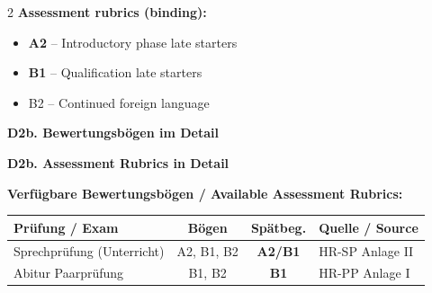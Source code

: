 \documentclass[10pt,a4paper]{article}
\newcommand{\secbil}[2]{%
\vspace{6pt}
\noindent\colorbox{spaet}{\parbox{0.48\textwidth}{\color{white}\bfseries\small #1}}%
\hfill%
\colorbox{english}{\parbox{0.48\textwidth}{\color{white}\bfseries\small #2}}
\vspace{3pt}
}
\begin{document}
\begin{paracol}{2}
\textbf{Assessment rubrics (binding):}\footnotemark[12]
\begin{itemize}[noitemsep,topsep=2pt]
\item \textcolor{spaet}{\textbf{A2}} -- Introductory phase late starters
\item \textcolor{spaet}{\textbf{B1}} -- Qualification late starters
\item B2 -- Continued foreign language
\end{itemize}

\end{paracol}


\vspace{3mm}

\secbil{D2b. Bewertungsbögen im Detail}{D2b. Assessment Rubrics in Detail}

\vspace{2mm}

\begin{center}
\small
\textbf{Verfügbare Bewertungsbögen / Available Assessment Rubrics:}
\vspace{1mm}

\begin{tabular}{|l|c|c|l|}
\hline
\rowcolor{lightgray}
\textbf{Prüfung / Exam} & \textbf{Bögen} & \textbf{Spätbeg.} & \textbf{Quelle / Source} \\
\hline
Sprechprüfung (Unterricht) & A2, B1, B2 & \textcolor{spaet}{\textbf{A2/B1}} & HR-SP Anlage II \\
\hline
Abitur Paarprüfung & B1, B2 & \textcolor{spaet}{\textbf{B1}} & HR-PP Anlage I \\
\hline
\end{tabular}
\end{center}

\vspace{2mm}
\end{document}
